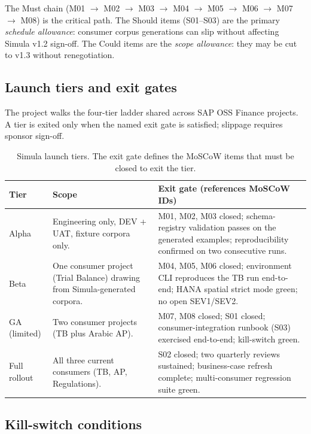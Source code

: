 \noindent
The Must chain (M01 $\to$ M02 $\to$ M03 $\to$ M04 $\to$ M05 $\to$ M06
$\to$ M07 $\to$ M08) is the critical path. The Should items
(S01--S03) are the primary \emph{schedule allowance}: consumer corpus
generations can slip without affecting Simula v1.2 sign-off. The Could
items are the \emph{scope allowance}: they may be cut to v1.3 without
renegotiation.

\subsection{Launch tiers and exit gates}\label{sec:sim-launch-tiers}

The project walks the four-tier ladder shared across SAP OSS Finance
projects. A tier is exited only when the named exit gate is satisfied;
slippage requires sponsor sign-off.

\begin{table}[htbp]
\centering
\caption{Simula launch tiers. The exit gate defines the MoSCoW items
that must be closed to exit the tier.}
\label{tab:sim-launch-tiers}
\footnotesize
\begin{tabularx}{\linewidth}{@{}l l X@{}}
\toprule
\textbf{Tier} & \textbf{Scope} & \textbf{Exit gate (references MoSCoW IDs)} \\ \midrule
Alpha & Engineering only, DEV + UAT, fixture corpora only. & M01, M02, M03 closed; schema-registry validation passes on the generated examples; reproducibility confirmed on two consecutive runs. \\
Beta  & One consumer project (Trial Balance) drawing from Simula-generated corpora. & M04, M05, M06 closed; environment CLI reproduces the TB run end-to-end; HANA spatial strict mode green; no open SEV1/SEV2. \\
GA (limited) & Two consumer projects (TB plus Arabic AP). & M07, M08 closed; S01 closed; consumer-integration runbook (S03) exercised end-to-end; kill-switch green. \\
Full rollout & All three current consumers (TB, AP, Regulations). & S02 closed; two quarterly reviews sustained; business-case refresh complete; multi-consumer regression suite green. \\
\bottomrule
\end{tabularx}
\end{table}

\subsection{Kill-switch conditions}\label{sec:sim-kill-switch}

